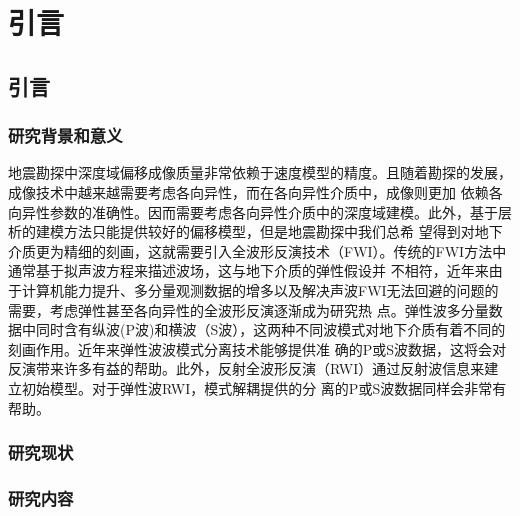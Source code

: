 \chapter{引言}
\section{引言}
\subsection{研究背景和意义}
地震勘探中深度域偏移成像质量非常依赖于速度模型的精度。且随着勘探的发展，成像技术中越来越需要考虑各向异性，而在各向异性介质中，成像则更加
依赖各向异性参数的准确性。因而需要考虑各向异性介质中的深度域建模。此外，基于层析的建模方法只能提供较好的偏移模型，但是地震勘探中我们总希
望得到对地下介质更为精细的刻画，这就需要引入全波形反演技术（FWI）。传统的FWI方法中通常基于拟声波方程来描述波场，这与地下介质的弹性假设并
不相符，近年来由于计算机能力提升、多分量观测数据的增多以及解决声波FWI无法回避的问题的需要，考虑弹性甚至各向异性的全波形反演逐渐成为研究热
点。弹性波多分量数据中同时含有纵波(P波)和横波（S波），这两种不同波模式对地下介质有着不同的刻画作用。近年来弹性波波模式分离技术能够提供准
确的P或S波数据，这将会对反演带来许多有益的帮助。此外，反射全波形反演（RWI）通过反射波信息来建立初始模型。对于弹性波RWI，模式解耦提供的分
离的P或S波数据同样会非常有帮助。
\subsection{研究现状}
\subsection{研究内容}
